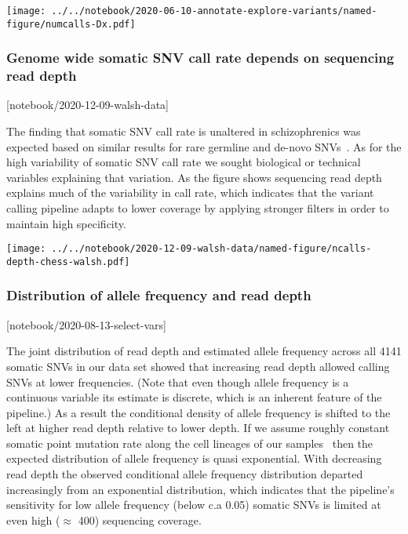 \documentclass[letterpaper]{article}
\begin{document}
\texttt{[image: ../../notebook/2020-06-10-annotate-explore-variants/named-figure/numcalls-Dx.pdf]}


\subsubsection*{Genome wide somatic SNV call rate depends on sequencing read depth}

[notebook/2020-12-09-walsh-data]

The finding that somatic SNV call rate is unaltered in schizophrenics was
expected based on similar results for rare germline and de-novo
SNVs~\citep{Purcell2014,Singh2017,Fromer2014,Rees2020}.
As for the high variability of somatic SNV call rate we sought 
biological or technical variables explaining that variation.  As the figure
shows sequencing read depth explains much of
the variability in call rate, which indicates that the variant calling
pipeline adapts to lower coverage by applying stronger filters in order to 
maintain high specificity.

\texttt{[image: ../../notebook/2020-12-09-walsh-data/named-figure/ncalls-depth-chess-walsh.pdf]}


\subsubsection*{Distribution of allele frequency and read depth}

[notebook/2020-08-13-select-vars]

The joint distribution of read depth and estimated allele frequency across all
4141 somatic SNVs in our data set showed that increasing read depth allowed
calling SNVs at lower frequencies.  (Note that even though allele frequency is
a continuous variable its estimate is discrete, which is an inherent feature
of the pipeline.)  As a result the conditional density of allele frequency is
shifted to the left at higher read depth relative to lower depth.  If we
assume roughly constant somatic point mutation rate along the cell lineages of
our samples~\citep{Rodin2021} then the expected distribution of allele
frequency is quasi exponential.  With decreasing read depth the observed
conditional allele frequency distribution departed increasingly from an
exponential distribution, which indicates that the pipeline's sensitivity for
low allele frequency (below c.a 0.05) somatic SNVs is limited at even high
(\(\approx\) 400) sequencing coverage.
\end{document}
